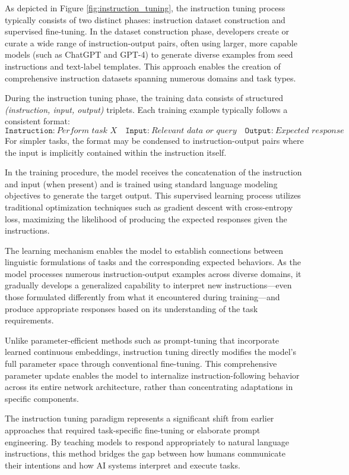 As depicted in Figure \ref{fig:instruction_tuning}, the instruction tuning process typically consists of two distinct phases: instruction dataset construction and supervised fine-tuning. In the dataset construction phase, developers create or curate a wide range of instruction-output pairs, often using larger, more capable models (such as ChatGPT and GPT-4) to generate diverse examples from seed instructions and text-label templates. This approach enables the creation of comprehensive instruction datasets spanning numerous domains and task types.

During the instruction tuning phase, the training data consists of structured \textit{(instruction, input, output)} triplets. Each training example typically follows a consistent format:
\[
\texttt{Instruction:}~\textit{Perform task X} \quad \texttt{Input:}~\textit{Relevant data or query} \quad \texttt{Output:}~\textit{Expected response}
\]
For simpler tasks, the format may be condensed to instruction-output pairs where the input is implicitly contained within the instruction itself.

In the training procedure, the model receives the concatenation of the instruction and input (when present) and is trained using standard language modeling objectives to generate the target output. This supervised learning process utilizes traditional optimization techniques such as gradient descent with cross-entropy loss, maximizing the likelihood of producing the expected responses given the instructions.

The learning mechanism enables the model to establish connections between linguistic formulations of tasks and the corresponding expected behaviors. As the model processes numerous instruction-output examples across diverse domains, it gradually develops a generalized capability to interpret new instructions—even those formulated differently from what it encountered during training—and produce appropriate responses based on its understanding of the task requirements.

Unlike parameter-efficient methods such as prompt-tuning that incorporate learned continuous embeddings, instruction tuning directly modifies the model's full parameter space through conventional fine-tuning. This comprehensive parameter update enables the model to internalize instruction-following behavior across its entire network architecture, rather than concentrating adaptations in specific components.

The instruction tuning paradigm represents a significant shift from earlier approaches that required task-specific fine-tuning or elaborate prompt engineering. By teaching models to respond appropriately to natural language instructions, this method bridges the gap between how humans communicate their intentions and how AI systems interpret and execute tasks.


